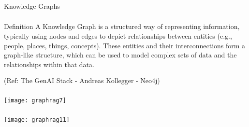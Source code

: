 \begin{frame}[fragile]\frametitle{}
\begin{center}
{\Large Knowledge Graphs}
\end{center}
\end{frame}

\begin{frame}[fragile]\frametitle{}
    \begin{block}{Definition}
A Knowledge Graph is a structured way of representing 
information, typically using nodes and edges to depict 
relationships between entities (e.g., people, places, 
things, concepts). 
These entities and their interconnections form a 
graph-like structure, which can be used to model 
complex sets of data and the relationships within that 
data.
    \end{block}
	
	{\tiny (Ref: The GenAI Stack - Andreas Kollegger - Neo4j)}
	
\end{frame}


\begin{frame}[fragile]\frametitle{}

	\begin{center}
	\texttt{[image: graphrag7]}
	\end{center}
	
\end{frame}

\begin{frame}[fragile]\frametitle{}

	\begin{center}
	\texttt{[image: graphrag11]}
	\end{center}
	
\end{frame}


